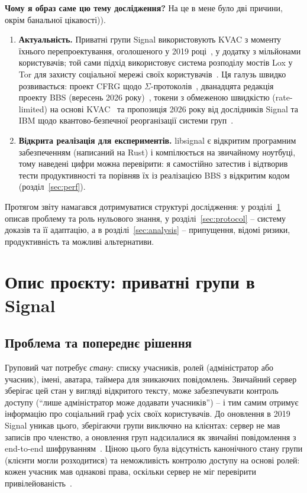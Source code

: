 \textbf{Чому я образ саме цю тему дослідження?} \noindent На це в мене було дві причини, окрім банальної цікавості)).
\begin{enumerate}
  \item \textbf{Актуальність.} Приватні групи Signal використовують KVAC з моменту їхнього перепроектування, 
    оголошеного у 2019 році~\cite{SignalBlog2019,CPZ20}, у додатку з мільйонами користувачів; той сами підхід 
    використовує система розподілу мостів Lox у Tor для захисту соціальної мережі своїх користувачів~\cite{Lox23}. 
    Ця галузь швидко розвивається: проект CFRG щодо $\Sigma$-протоколів~\cite{SigmaDraft}, дванадцята редакція 
    проекту BBS (вересень 2026 року)~\cite{BBSdraft}, токени з обмеженою швидкістю (rate-limited) на основі 
    KVAC~\cite{ARC25} та пропозиція 2026 року від дослідників Signal та IBM щодо квантово-безпечної реорганізації 
    системи груп~\cite{Connell26}.
  \item \textbf{Відкрита реалізація для експериментів.} libsignal є відкритим програмним забезпеченням (написаний 
    на Rust) і компілюється на звичайному ноутбуці, тому наведені цифри можна перевірити: я самостійно затестив 
    і відтворив тести продуктивності та порівняв їх із реалізацією BBS з відкритим кодом~\cite{zkryptium} (розділ~\ref{sec:perf}).
\end{enumerate}

\noindent Протягом звіту намагався дотримуватися структурі дослідження: у розділі~\ref{sec:project} описав проблему 
та роль нульового знання, у розділі~\ref{sec:protocol} -- систему доказів та її адаптацію, а в розділі~\ref{sec:analysis} 
-- припущення, відомі ризики, продуктивність та можливі альтернативи.

\section{Опис проєкту: приватні групи в Signal}
\label{sec:project}

\subsection{Проблема та попереднє рішення}
Груповий чат потребує \emph{стану}: списку учасників, ролей (адміністратор або учасник), імені, аватара, таймера 
для зникаючих повідомлень. Звичайний сервер зберігає цей стан у вигляді відкритого тексту, може забезпечувати 
контроль доступу (\enquote{лише адміністратор може додавати учасників}) -- і тим самим отримує інформацію про 
соціальний граф усіх своїх користувачів. До оновлення в 2019 Signal уникав цього, зберігаючи групи виключно на 
клієнтах: сервер не мав записів про членство, а оновлення груп надсилалися як звичайні повідомлення з end-to-end 
шифруванням~\cite{SignalBlog2019}. Ціною цього була відсутність канонічного стану групи (клієнти могли розходитися) 
та неможливість контролю доступу на основі ролей: кожен учасник мав однакові права, оскільки сервер не міг 
перевірити привілейованість~\cite{SignalBlog2019}.

